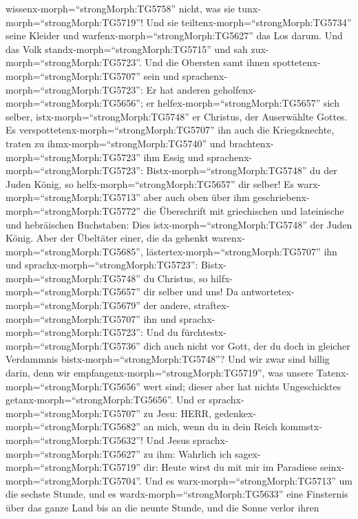 wissenx-morph=``strongMorph:TG5758'' nicht, was sie
tunx-morph=``strongMorph:TG5719''! Und sie
teiltenx-morph=``strongMorph:TG5734'' seine Kleider und
warfenx-morph=``strongMorph:TG5627'' das Los darum.  Und
das Volk standx-morph=``strongMorph:TG5715'' und sah
zux-morph=``strongMorph:TG5723''. Und die Obersten samt ihnen
spottetenx-morph=``strongMorph:TG5707'' sein und
sprachenx-morph=``strongMorph:TG5723'': Er hat anderen
geholfenx-morph=``strongMorph:TG5656''; er
helfex-morph=``strongMorph:TG5657'' sich selber,
istx-morph=``strongMorph:TG5748'' er Christus, der Auserwählte Gottes.
 Es verspottetenx-morph=``strongMorph:TG5707'' ihn auch die
Kriegsknechte, traten zu ihmx-morph=``strongMorph:TG5740'' und
brachtenx-morph=``strongMorph:TG5723'' ihm Essig  und
sprachenx-morph=``strongMorph:TG5723'':
Bistx-morph=``strongMorph:TG5748'' du der Juden König, so
helfx-morph=``strongMorph:TG5657'' dir selber!  Es
warx-morph=``strongMorph:TG5713'' aber auch oben über ihm
geschriebenx-morph=``strongMorph:TG5772'' die Überschrift mit
griechischen und lateinische und hebräischen Buchstaben: Dies
istx-morph=``strongMorph:TG5748'' der Juden König.  Aber
der Übeltäter einer, die da gehenkt warenx-morph=``strongMorph:TG5685'',
lästertex-morph=``strongMorph:TG5707'' ihn und
sprachx-morph=``strongMorph:TG5723'': Bistx-morph=``strongMorph:TG5748''
du Christus, so hilfx-morph=``strongMorph:TG5657'' dir selber und uns!
 Da antwortetex-morph=``strongMorph:TG5679'' der andere,
straftex-morph=``strongMorph:TG5707'' ihn und
sprachx-morph=``strongMorph:TG5723'': Und du
fürchtestx-morph=``strongMorph:TG5736'' dich auch nicht vor Gott, der du
doch in gleicher Verdammnis bistx-morph=``strongMorph:TG5748''?
 Und wir zwar sind billig darin, denn wir
empfangenx-morph=``strongMorph:TG5719'', was unsere
Tatenx-morph=``strongMorph:TG5656'' wert sind; dieser aber hat nichts
Ungeschicktes getanx-morph=``strongMorph:TG5656''.  Und er
sprachx-morph=``strongMorph:TG5707'' zu Jesu: HERR,
gedenkex-morph=``strongMorph:TG5682'' an mich, wenn du in dein Reich
kommstx-morph=``strongMorph:TG5632''!  Und Jesus
sprachx-morph=``strongMorph:TG5627'' zu ihm: Wahrlich ich
sagex-morph=``strongMorph:TG5719'' dir: Heute wirst du mit mir im
Paradiese seinx-morph=``strongMorph:TG5704''.  Und es
warx-morph=``strongMorph:TG5713'' um die sechste Stunde, und es
wardx-morph=``strongMorph:TG5633'' eine Finsternis über das ganze Land
bis an die neunte Stunde,  und die Sonne verlor ihren
